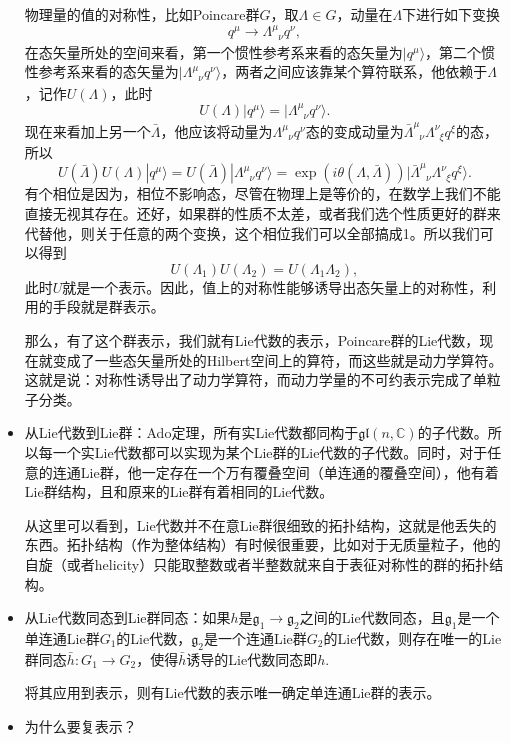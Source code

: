 \documentclass[9pt]{extarticle}
\newcommand{\cc}{\mathbb{C}}
\newcommand{\lag}{{\mathfrak{g}}}
\begin{document}
\begin{itemize}
物理量的值的对称性，比如Poincare群$G$，取$\Lambda \in G$，动量在$\Lambda$下进行如下变换
\[
	q^\mu \to \Lambda^\mu_{\phantom{\mu}\nu}q^\nu,
\]
在态矢量所处的空间来看，第一个惯性参考系来看的态矢量为$|q^\mu\rangle$，第二个惯性参考系来看的态矢量为$|\Lambda^\mu_{\phantom{\mu}\nu}q^\nu\rangle$，两者之间应该靠某个算符联系，他依赖于$\Lambda$，记作$U(\Lambda)$，此时
\[
	U(\Lambda)|q^\mu\rangle = |\Lambda^\mu_{\phantom{\mu}\nu}q^\nu\rangle.
\]
现在来看加上另一个$\bar\Lambda$，他应该将动量为$\Lambda^\mu_{\phantom{\mu}\nu}q^\nu$态的变成动量为$\bar{\Lambda}^\mu_{\phantom{\mu}\nu}\Lambda^\nu_{\phantom{\nu}\xi}q^\xi$的态，所以
\[
	U(\bar\Lambda)U(\Lambda)|q^\mu\rangle = U(\bar\Lambda)|\Lambda^\mu_{\phantom{\mu}\nu}q^\nu\rangle = \exp(i\theta(\Lambda,\bar\Lambda))|\bar{\Lambda}^\mu_{\phantom{\mu}\nu}\Lambda^\nu_{\phantom{\nu}\xi}q^\xi\rangle.
\]
有个相位是因为，相位不影响态，尽管在物理上是等价的，在数学上我们不能直接无视其存在。还好，如果群的性质不太差，或者我们选个性质更好的群来代替他，则关于任意的两个变换，这个相位我们可以全部搞成1。所以我们可以得到
\[
	U(\Lambda_1)U(\Lambda_2)=U(\Lambda_1\Lambda_2),
\]
此时$U$就是一个表示。因此，值上的对称性能够诱导出态矢量上的对称性，利用的手段就是群表示。

那么，有了这个群表示，我们就有Lie代数的表示，Poincare群的Lie代数，现在就变成了一些态矢量所处的Hilbert空间上的算符，而这些就是动力学算符。这就是说：对称性诱导出了动力学算符，而动力学量的不可约表示完成了单粒子分类。

\item 从Lie代数到Lie群：Ado定理，所有实Lie代数都同构于$\mathfrak{gl}(n,\cc)$的子代数。所以每一个实Lie代数都可以实现为某个Lie群的Lie代数的子代数。同时，对于任意的连通Lie群，他一定存在一个万有覆叠空间（单连通的覆叠空间），他有着Lie群结构，且和原来的Lie群有着相同的Lie代数。

从这里可以看到，Lie代数并不在意Lie群很细致的拓扑结构，这就是他丢失的东西。拓扑结构（作为整体结构）有时候很重要，比如对于无质量粒子，他的自旋（或者helicity）只能取整数或者半整数就来自于表征对称性的群的拓扑结构。

\item 从Lie代数同态到Lie群同态：如果$h$是$\lag_1\to \lag_2$之间的Lie代数同态，且$\lag_1$是一个单连通Lie群$G_1$的Lie代数，$\lag_2$是一个连通Lie群$G_2$的Lie代数，则存在唯一的Lie群同态$\bar{h}:G_1\to G_2$，使得$\bar{h}$诱导的Lie代数同态即$h$.

将其应用到表示，则有Lie代数的表示唯一确定单连通Lie群的表示。

\item 为什么要复表示？


\end{itemize}
\end{document}

